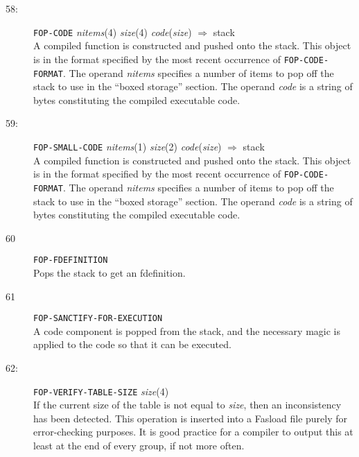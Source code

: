 \begin{description}
\item[58:] \hspace{2em} {\tt FOP-CODE} \hspace{2em} {\it nitems}(4) \hspace{2em} {\it size}(4) \hspace{2em}
{\it code}({\it size}) \hspace{2em} $\Rightarrow$ \hspace{2em} stack \\
A compiled function is constructed and pushed onto the stack.
This object is in the format specified by the most recent
occurrence of {\tt FOP-CODE-FORMAT}.
The operand {\it nitems} specifies a number of items to pop off
the stack to use in the ``boxed storage'' section.  The operand {\it code}
is a string of bytes constituting the compiled executable code.

\item[59:] \hspace{2em} {\tt FOP-SMALL-CODE} \hspace{2em} {\it nitems}(1) \hspace{2em} {\it size}(2) \hspace{2em}
{\it code}({\it size}) \hspace{2em} $\Rightarrow$ \hspace{2em} stack \\
A compiled function is constructed and pushed onto the stack.
This object is in the format specified by the most recent
occurrence of {\tt FOP-CODE-FORMAT}.
The operand {\it nitems} specifies a number of items to pop off
the stack to use in the ``boxed storage'' section.  The operand {\it code}
is a string of bytes constituting the compiled executable code.

\item[60] \hspace{2em} {\tt FOP-FDEFINITION} \hspace{2em} \\
Pops the stack to get an fdefinition.

\item[61] \hspace{2em} {\tt FOP-SANCTIFY-FOR-EXECUTION} \hspace{2em} \\
A code component is popped from the stack, and the necessary magic is applied 
to the code so that it can be executed.

\item[62:] \hspace{2em} {\tt FOP-VERIFY-TABLE-SIZE} \hspace{2em} {\it size}(4) \\
If the current size of the table is not equal to {\it size},
then an inconsistency has been detected.  This operation
is inserted into a Fasload file purely for error-checking purposes.
It is good practice for a compiler to output this at least at the
end of every group, if not more often.


\end{description}
